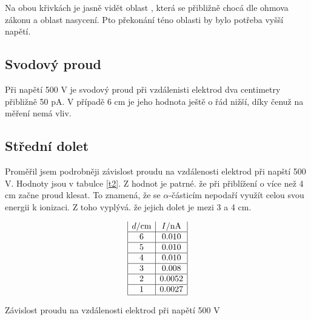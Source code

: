 \documentclass[a4paper,12pt]{article}
\begin{document}
Na obou křivkách je jasně vidět oblast , která se přibližně chocá dle ohmova zákonu a oblast nasycení. Pto překonání téno oblasti by bylo potřeba vyšší napětí.

\subsection{Svodový proud}
Při napětí 500 V je svodový proud při vzdálenisti elektrod dva centimetry přibližně 50 pA. V případě 6 cm je jeho hodnota ještě o řád nižší, díky čenuž na měření nemá vliv.

\subsection{Střední dolet}
Proměřil jsem podrobněji závislost proudu na vzdálenosti elektrod při napští 
500 V. Hodnoty jsou v tabulce \ref{t2}. Z hodnot je patrné. že při přiblížení 
o více než 4 cm začne proud klesat. To znamená, že se $\alpha$-částicím nepodaří využít celou svou energii k ionizaci. Z toho vyplývá. že jejich dolet je mezi 3 a 4 cm.

\begin{table}
$$
\begin{array}{|c|c|}
d/\mbox{cm}&    I/\mbox{nA} \\ \hline
6&  0.010\\ \hline
5&  0.010\\ \hline
4&  0.010\\ \hline
3&  0.008\\ \hline
2&  0.0052\\ \hline
1&  0.0027\\ \hline
\end{array}
$$
\caption{Závislost proudu na vzdálenosti elektrod při napětí 500 V}
\label{t2}
\end{table}
\end{document}
